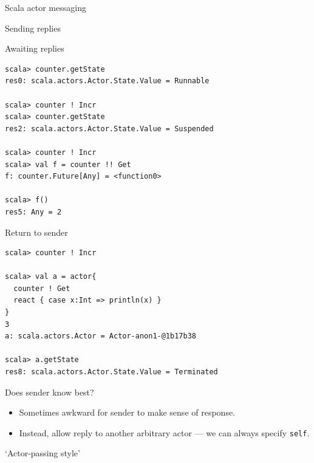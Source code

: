 \documentclass[14pt,t,usepdftitle=false,
xcolornames=x11names,svgnames,dvipsnames]{beamer}
\begin{document}
\begin{frame}[fragile]{Scala actor messaging}
  
\end{frame}


\begin{frame}[fragile]{Sending replies}
  
\end{frame}

\begin{frame}[fragile]{Awaiting replies}
  \begin{lstlisting}[style=scalarepl]
scala> counter.getState
res0: scala.actors.Actor.State.Value = Runnable

scala> counter ! Incr
scala> counter.getState
res2: scala.actors.Actor.State.Value = Suspended

scala> counter ! Incr
scala> val f = counter !! Get
f: counter.Future[Any] = <function0>

scala> f()
res5: Any = 2
  \end{lstlisting}
\end{frame}

\begin{frame}[fragile]{Return to sender}
  \begin{lstlisting}[style=scalarepl]
scala> counter ! Incr

scala> val a = actor{
  counter ! Get
  react { case x:Int => println(x) }
}
3
a: scala.actors.Actor = Actor-anon1-@1b17b38

scala> a.getState
res8: scala.actors.Actor.State.Value = Terminated
\end{lstlisting}
\end{frame}

\begin{frame}{Does sender know best?}
  \begin{itemize}
  \item Sometimes awkward for sender to make sense of response.
  \item Instead, allow reply to another arbitrary actor --- 
    we can always specify \lstinline:self:.
  \end{itemize}
\end{frame}

\begin{frame}[fragile]{`Actor-passing style'}
  
\end{frame}
\end{document}

